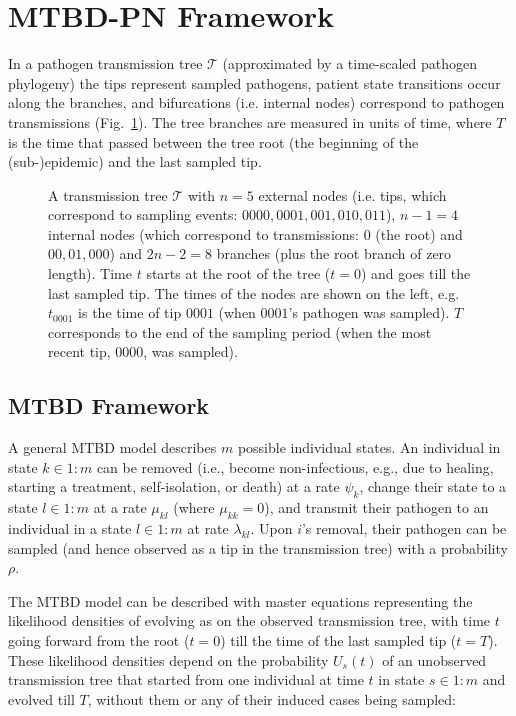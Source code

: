 \documentclass[a4paper,10pt]{article}
\begin{document}
\section{MTBD-PN Framework}
In a pathogen transmission tree $\mathscr{T}$ (approximated by a time-scaled pathogen phylogeny) the tips represent sampled pathogens, patient state transitions occur along the branches, and bifurcations (i.e. internal nodes) correspond to pathogen transmissions (Fig.~\ref{fig:tt}). The tree branches are measured in units of time, where $T$ is the time that passed between the tree root (the beginning of the (sub-)epidemic) and the last sampled tip. 


\begin{figure}[tbhp]
\centering 

\caption{A transmission tree $\mathscr{T}$ with $n=5$ external nodes (i.e. tips, which correspond to sampling events: $0000, 0001, 001, 010, 011$), $n-1=4$ internal nodes (which correspond to transmissions: $0$ (the root) and $00, 01, 000$) and $2n - 2 = 8$ branches (plus the root branch of zero length). %
Time $t$ starts at the root of the tree ($t=0$) and goes till the last sampled tip. The times of the nodes are shown on the left, e.g. $t_{0001}$ is the time of tip $0001$ (when $0001$'s pathogen was sampled). $T$ corresponds to the end of the sampling period (when the most recent tip, $0000$, was sampled).}
\label{fig:tt} 
\end{figure}

\subsection{MTBD Framework}
A general MTBD model describes $m$ possible individual states. An individual in state $k \in 1:m$ can be removed (i.e., become non-infectious, e.g., due to healing, starting a treatment, self-isolation, or death) at a rate $\psi_k$, change their state to a state $l \in 1:m$ at a rate $\mu_{kl}$ (where $\mu_{kk} = 0$), and transmit their pathogen to an individual in a state $l \in 1:m$ at rate $\lambda_{kl}$. Upon $i$'s removal, their pathogen can be sampled (and hence observed as a tip in the transmission tree) with a probability $\rho$. 

The MTBD model can be described with master equations representing the likelihood densities of evolving as on the observed transmission tree, with time $t$ going forward from the root ($t=0$) till the time of the last sampled tip ($t=T$). These likelihood densities depend on the probability $U_s(t)$ of an unobserved transmission tree that started from one individual at time $t$ in state $s \in 1:m$ and evolved till $T$, without them or any of their induced cases being sampled: 
\end{document}
